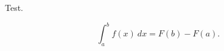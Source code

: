 \documentclass{minimal}
\begin{document}
Test.

\[
    \int_{a}^{b} f(x) \ dx = F(b) - F(a).
\]
\end{document}

